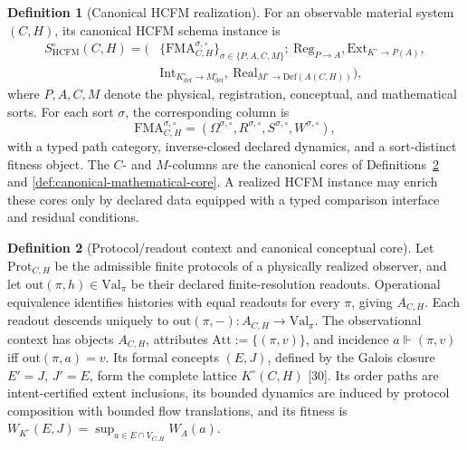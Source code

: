 \documentclass[11pt]{article}
\theoremstyle{definition}
\newtheorem{definition}{Definition}
\begin{document}
\begin{definition}[Canonical HCFM realization]
\label{def:canonical-hcfm-realization}
For an observable material system $(C, H)$, its canonical HCFM schema instance is
\begin{equation}
\begin{aligned}
S^{\circ}_{\mathrm{HCFM}}(C, H) = \big(&\{\mathrm{FMA}^{\sigma,\circ}_{C,H}\}_{\sigma \in \{P,A,C,M\}};\ \mathrm{Reg}_{P \to A}, \mathrm{Ext}_{K^{\circ} \to P(A)},\\
&\mathrm{Int}_{K^{\circ}_{\mathrm{def}} \to M^{\circ}_{\mathrm{def}}},\ \mathrm{Real}_{M^{\circ} \to \mathrm{Def}(A(C,H))}\big),
\end{aligned}\tag{S9}
\end{equation}
where $P, A, C, M$ denote the physical, registration, conceptual, and mathematical sorts. For each sort $\sigma$, the corresponding column is
\[
\mathrm{FMA}^{\sigma,\circ}_{C,H} = (\Omega^{\sigma,\circ}, R^{\sigma,\circ}, S^{\sigma,\circ}, W^{\sigma,\circ}),
\]
with a typed path category, inverse-closed declared dynamics, and a sort-distinct fitness object. The $C$- and $M$-columns are the canonical cores of Definitions~\ref{def:canonical-conceptual-core} and \ref{def:canonical-mathematical-core}. A realized HCFM instance may enrich these cores only by declared data equipped with a typed comparison interface and residual conditions.
\end{definition}

\begin{definition}[Protocol/readout context and canonical conceptual core]
\label{def:canonical-conceptual-core}
Let $\mathrm{Prot}_{C,H}$ be the admissible finite protocols of a physically realized observer, and let $\mathrm{out}(\pi, h) \in \mathrm{Val}_\pi$ be their declared finite-resolution readouts. Operational equivalence identifies histories with equal readouts for every $\pi$, giving $A_{C,H}$. Each readout descends uniquely to $\mathrm{out}(\pi, -) : A_{C,H} \to \mathrm{Val}_\pi$. The observational context has objects $A_{C,H}$, attributes $\mathrm{Att} := \{(\pi, v)\}$, and incidence $a \Vdash (\pi, v)$ iff $\mathrm{out}(\pi, a) = v$. Its formal concepts $(E, J)$, defined by the Galois closure $E' = J$, $J' = E$, form the complete lattice $K^{\circ}(C, H)$ [30]. Its order paths are intent-certified extent inclusions, its bounded dynamics are induced by protocol composition with bounded flow translations, and its fitness is $W_{K^{\circ}}(E, J) = \sup_{a \in E \cap V_{C,H}} W_A(a)$.
\end{definition}
\end{document}
